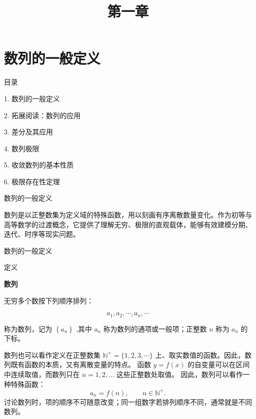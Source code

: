 \documentclass[aspectratio=169,10pt,fontset=fandol]{ctexbeamer}
\title{第一章}
\begin{document}
\section{数列的一般定义}
\begin{frame}[t,fragile]{目录}
\normalsize
{\color{blue}\normalsize 1. 数列的一般定义\par}\vspace{0.3em}
{\color{gray!40}\normalsize 2. 拓展阅读：数列的应用\par}\vspace{0.3em}
{\color{gray!40}\normalsize 3. 差分及其应用\par}\vspace{0.3em}
{\color{gray!40}\normalsize 4. 数列极限\par}\vspace{0.3em}
{\color{gray!40}\normalsize 5. 收敛数列的基本性质\par}\vspace{0.3em}
{\color{gray!40}\normalsize 6. 极限存在性定理\par}\vspace{0.3em}
\end{frame}
\begin{frame}[t,fragile]{数列的一般定义}
\footnotesize
{\footnotesize
数列是以正整数集为定义域的特殊函数，用以刻画有序离散数量变化。作为初等与高等数学的过渡概念，它提供了理解无穷、极限的直观载体，能够有效建模分期、迭代、时序等现实问题。


}
\end{frame}
\begin{frame}[t,fragile]{数列的一般定义}
\footnotesize
\begin{block}{定义}
{\footnotesize
\textbf{数列}\par

无穷多个数按下列顺序排列：

$$
a_1, a_2, \cdots, a_n, \cdots
$$

称为数列，记为 $\left\{a_n\right\}$ ,其中 $a_n$ 称为数列的通项或一般项；正整数 $n$ 称为 $a_n$ 的下标。

数列也可以看作定义在正整数集 $\mathbb{N}^+=\{1,2,3,\cdots\}$ 上、取实数值的函数。因此，数列既有函数的本质，又有离散变量的特点。 函数 $y=f(x)$ 的自变量可以在区间中连续取值，而数列只在 $n=1,2,\ldots$ 这些正整数处取值。 因此，数列可以看作一种特殊函数：
\[
a_n=f(n),\qquad n\in\mathbb{N}^+.
\]
讨论数列时，项的顺序不可随意改变；同一组数字若排列顺序不同，通常就是不同数列。

}
\end{block}
\end{frame}
\end{document}
